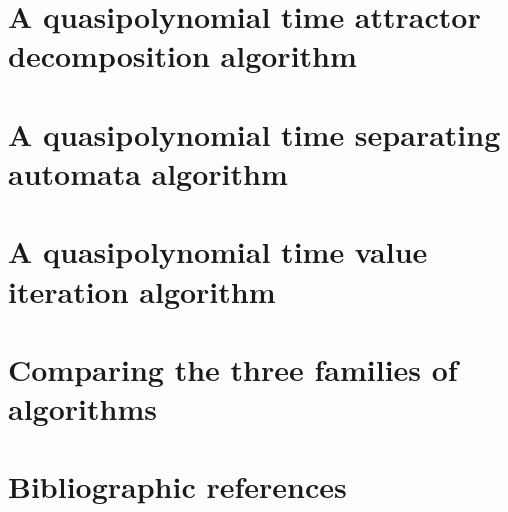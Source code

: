 
\section{A quasipolynomial time attractor decomposition algorithm}
\label{3-sec:zielonka}



\section{A quasipolynomial time separating automata algorithm}
\label{3-sec:separation}



\section{A quasipolynomial time value iteration algorithm}
\label{3-sec:value_iteration}



\section{Comparing the three families of algorithms}
\label{3-sec:relationships}



\section*{Bibliographic references}
\label{3-sec:references}




